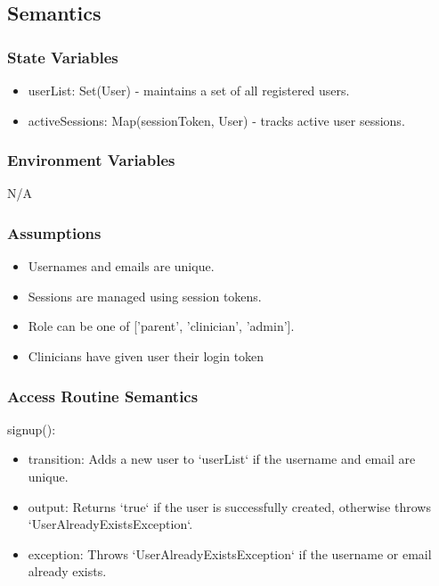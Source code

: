 \documentclass[12pt, titlepage]{article}
\begin{document}
\subsection{Semantics}

\subsubsection{State Variables}

\begin{itemize}
\item userList: Set(User) - maintains a set of all registered users.
\item activeSessions: Map(sessionToken, User) - tracks active user sessions.
\end{itemize}

\subsubsection{Environment Variables}

N/A

\subsubsection{Assumptions}

\begin{itemize}
\item Usernames and emails are unique.
\item Sessions are managed using session tokens.
\item Role can be one of ['parent', 'clinician', 'admin'].
\item Clinicians have given user their login token
\end{itemize}

\subsubsection{Access Routine Semantics}

\noindent signup():
\begin{itemize}
\item transition: Adds a new user to `userList` if the username and email are unique.
\item output: Returns `true` if the user is successfully created, otherwise throws `UserAlreadyExistsException`.
\item exception: Throws `UserAlreadyExistsException` if the username or email already exists.
\end{itemize}
\end{document}
